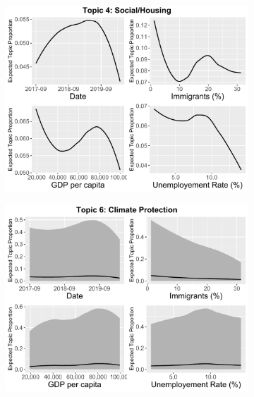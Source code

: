 \begin{figure}[h!]
    \centering
     \captionsetup{justification=centering,margin=2cm}
  \begin{subfigure}[b]{0.3\linewidth}
    \includegraphics[width=\linewidth]{../plots/5_1/stanbeta_t4_without_credible.pdf}
  \end{subfigure}
  \begin{subfigure}[b]{0.3\linewidth}
    \includegraphics[width=\linewidth]{../plots/5_1/stanbeta_t6_with_credible.pdf}
  \end{subfigure}
  \begin{subfigure}[b]{0.3\linewidth}

\end{subfigure}
\end{figure}

